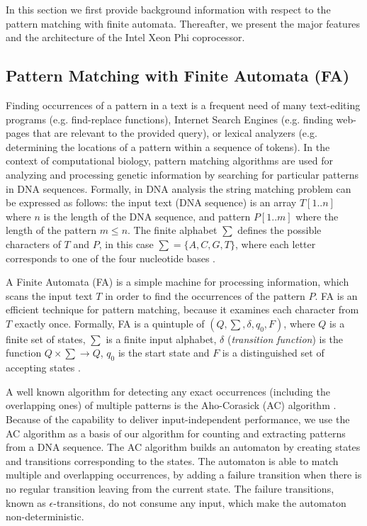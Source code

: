 \documentclass[conference]{IEEEtran}
\begin{document}
In this section we first provide background information with respect to the pattern matching with finite automata. Thereafter, we present the major features and the architecture of the Intel Xeon Phi coprocessor.

\subsection{Pattern Matching with Finite Automata (FA)}

Finding occurrences of a pattern in a text is a frequent need of many text-editing programs (e.g. find-replace functions), Internet Search Engines (e.g. finding web-pages that are relevant to the provided query), or lexical analyzers (e.g. determining the locations of a pattern within a sequence of tokens). In the context of computational biology, pattern matching algorithms are used for analyzing and processing genetic information by searching for particular patterns in DNA sequences. Formally, in DNA analysis the string matching problem can be expressed as follows: the input text (DNA sequence) is an array $T[1..n]$ where $n$ is the length of the DNA sequence, and pattern $P[1..m]$ where the length of the pattern $m \leq n$. The finite alphabet $\sum$ defines the possible characters of $T$ and $P$, in this case $\sum = \{A,C,G,T\}$, where each letter corresponds to one of the four nucleotide bases \cite{hopcroftullman}.

A Finite Automata (FA) is a simple machine for processing information, which scans the input text $T$ in order to find the occurrences of the pattern $P$. FA is an efficient technique for pattern matching, because it examines each character from $T$ exactly once. Formally, FA is a quintuple of $(Q, \sum, \delta, q_0, F)$, where $Q$ is a finite set of states, $\sum$ is a finite input alphabet, $\delta$ (\emph{transition function}) is the function $Q \times \sum \rightarrow Q$, $q_0$ is the start state and $F$ is a distinguished set of accepting states \cite{hopcroftullman}.

A well known algorithm for detecting any exact occurrences (including the overlapping ones) of multiple patterns is the Aho-Corasick (AC) algorithm \cite{Aho-Corasick}. Because of the capability to deliver input-independent performance, we use the AC algorithm as a basis of our algorithm for counting and extracting patterns from a DNA sequence. The AC algorithm builds an automaton by creating states and transitions corresponding to the states. The automaton is able to match multiple and overlapping occurrences, by adding a failure transition when there is no regular transition leaving from the current state. The failure transitions, known as $\epsilon$-transitions, do not consume any input, which make the automaton non-deterministic.
\end{document}
